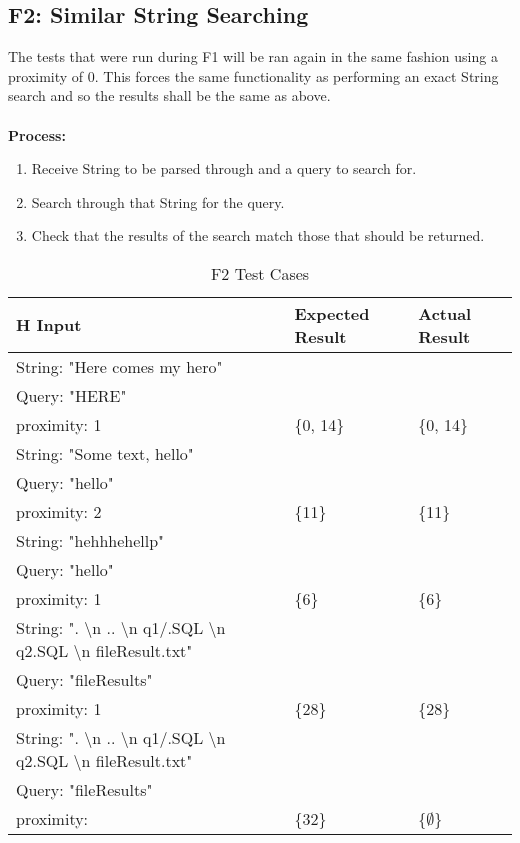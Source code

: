 \documentclass[12pt, titlepage]{article}
\begin{document}
\subsection{F2: Similar String Searching}
The tests that were run during F1 will be ran again in the same fashion using a proximity of 0. This forces the same functionality as performing an exact String search and so the results shall be the same as above.\\\\
\textbf{Process:}
\begin{enumerate}
\item{Receive String to be parsed through and a query to search for.}
\item{Search through that String for the query.}
\item{Check that the results of the search match those that should be returned.}
\end{enumerate}
\begin{table}[h!]
\centering
\begin{tabular}{ p{7cm}  p{4cm}  p{4cm} }{H}
	Input &Expected Result &Actual Result\\ \hline
	String: "Here comes my hero"\\
	Query: "HERE"\\
	proximity: 1 & \{0, 14\} & \{0, 14\}\\ \hline
	String: "Some text, hello"\\
	Query: "hello"\\
	proximity: 2 & \{11\} & \{11\}\\ \hline
	String: "hehhhehellp"\\
	Query: "hello"\\
	proximity: 1 & \{6\} & \{6\}\\ \hline
	String: ". \textbackslash n .. \textbackslash n q1/.SQL \textbackslash n q2.SQL \textbackslash n fileResult.txt"\\
	Query: "fileResults"\\
	proximity: 1 & \{28\} & \{28\}\\ \hline
	String: ". \textbackslash n .. \textbackslash n q1/.SQL \textbackslash n q2.SQL \textbackslash n fileResult.txt"\\
	Query: "fileResults"\\
	proximity: & \{32\} & \{$\emptyset$\}\\ \hline
\end{tabular}
\caption{F2 Test Cases}
\label{table:F2 Test Cases}
\end{table}
\end{document}

